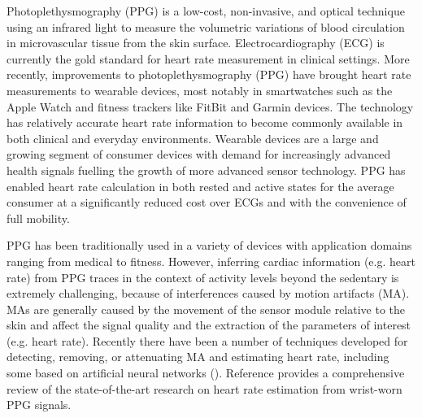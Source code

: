\documentclass[12pt, conference]{IEEEtran}
\begin{document}
Photoplethysmography (PPG) is a low-cost, non-invasive, and optical technique using an infrared light to measure the volumetric variations of blood circulation in microvascular tissue from the skin surface. Electrocardiography (ECG) is currently the gold standard for heart rate measurement in clinical settings. More recently, improvements to photoplethysmography (PPG) have brought heart rate measurements to wearable devices, most notably in smartwatches such as the Apple Watch and fitness trackers like FitBit and Garmin devices. The technology has relatively accurate heart rate information to become commonly available in both clinical and everyday environments. Wearable devices are a large and growing segment of consumer devices with demand for increasingly advanced health signals fuelling the growth of more advanced sensor technology. PPG has enabled heart rate calculation in both rested and active states for the average consumer at a significantly reduced cost over ECGs and with the convenience of full mobility. 

PPG has been traditionally used in a variety of devices with application domains ranging from medical to fitness. However, inferring cardiac information (e.g. heart rate) from PPG traces in the context of activity levels beyond the sedentary is extremely challenging, because of interferences caused by motion artifacts (MA). MAs are generally caused by the movement of the sensor module relative to the skin and affect the signal quality and the extraction of the parameters of interest (e.g. heart rate). Recently there have been a number of techniques developed for detecting, removing, or attenuating MA and estimating heart rate, including some based on artificial neural networks (\cite{reiss2019deep,salehizadeh2016novel,brophy2020optimised,biswas2019cornet,panwar2020pp,chang2021deepheart}). Reference \cite{biswas2019heart} provides a comprehensive review of the state-of-the-art research on heart rate estimation from wrist-worn PPG signals.
\end{document}
